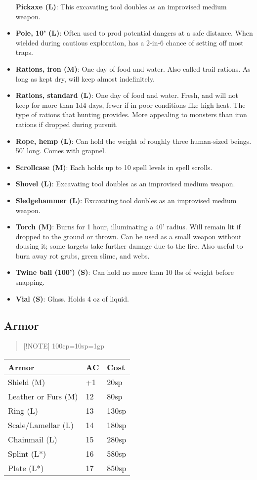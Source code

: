 \documentclass{article}
\begin{document}
\begin{multicols}{2}
\begin{itemize}
  \textbf{Pickaxe (L)}: This excavating tool doubles as an improvised
  medium weapon.
\item
  \textbf{Pole, 10' (L)}: Often used to prod potential dangers at a safe
  distance. When wielded during cautious exploration, has a 2-in-6
  chance of setting off most traps.
\item
  \textbf{Rations, iron (M)}: One day of food and water. Also called
  trail rations. As long as kept dry, will keep almost indefinitely.
\item
  \textbf{Rations, standard (L)}: One day of food and water. Fresh, and
  will not keep for more than 1d4 days, fewer if in poor conditions like
  high heat. The type of rations that hunting provides. More appealing
  to monsters than iron rations if dropped during pursuit.
\item
  \textbf{Rope, hemp (L)}: Can hold the weight of roughly three
  human-sized beings. 50' long. Comes with grapnel.
\item
  \textbf{Scrollcase (M)}: Each holds up to 10 spell levels in spell
  scrolls.
\item
  \textbf{Shovel (L)}: Excavating tool doubles as an improvised medium
  weapon.
\item
  \textbf{Sledgehammer (L)}: Excavating tool doubles as an improvised
  medium weapon.
\item
  \textbf{Torch (M)}: Burns for 1 hour, illuminating a 40' radius. Will
  remain lit if dropped to the ground or thrown. Can be used as a small
  weapon without dousing it; some targets take further damage due to the
  fire. Also useful to burn away rot grubs, green slime, and webs.
\item
  \textbf{Twine ball (100') (S)}: Can hold no more than 10 lbs of weight
  before snapping.
\item
  \textbf{Vial (S)}: Glass. Holds 4 oz of liquid.
\end{itemize}

\subsection{Armor}\label{armor}

\begin{quote}
{[}!NOTE{]} 100cp=10sp=1gp
\end{quote}

\begin{longtable}[]{@{}lll@{}}
\toprule\noalign{}
Armor & AC & Cost \\
\midrule\noalign{}
\endhead
\bottomrule\noalign{}
\endlastfoot
Shield (M) & +1 & 20sp \\
Leather or Furs (M) & 12 & 80sp \\
Ring (L) & 13 & 130sp \\
Scale/Lamellar (L) & 14 & 180sp \\
Chainmail (L) & 15 & 280sp \\
Splint (L*) & 16 & 580sp \\
Plate (L*) & 17 & 850sp \\
\end{longtable}


\end{multicols}
\end{document}
